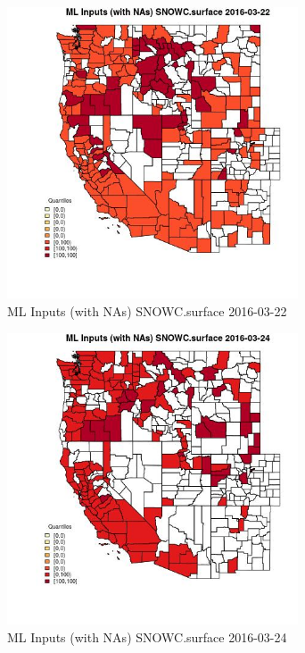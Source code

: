 \begin{figure} 
\centering  
\includegraphics[width=0.77\textwidth]{Code_Outputs/Report_ML_input_PM25_Step4_part_e_de_duplicated_aveswNAs_CountySNOWCsurfaceMean2016-03-22_2016-03-22.jpg} 
\caption{\label{fig:Report_ML_input_PM25_Step4_part_e_de_duplicated_aveswNAsCountySNOWCsurfaceMean2016-03-22_2016-03-22}ML Inputs (with NAs) SNOWC.surface 2016-03-22} 
\end{figure} 
 

\begin{figure} 
\centering  
\includegraphics[width=0.77\textwidth]{Code_Outputs/Report_ML_input_PM25_Step4_part_e_de_duplicated_aveswNAs_CountySNOWCsurfaceMean2016-03-24_2016-03-24.jpg} 
\caption{\label{fig:Report_ML_input_PM25_Step4_part_e_de_duplicated_aveswNAsCountySNOWCsurfaceMean2016-03-24_2016-03-24}ML Inputs (with NAs) SNOWC.surface 2016-03-24} 
\end{figure} 
 

